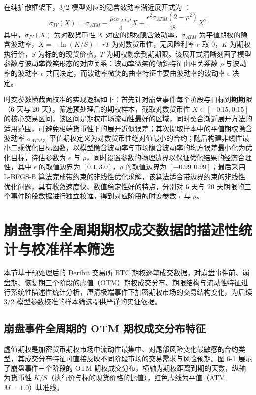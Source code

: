 在纯扩散框架下，3/2 模型对应的隐含波动率渐近展开式为\citet{medvedevApproximationCalibrationShortTerm2007} ：
\[
\sigma_{IV}(X) = \sigma_{ATM} - \frac{\rho \epsilon \sigma_{ATM}}{4} X + \frac{\epsilon^2 \sigma_{ATM} (2-\rho^2)}{48} X^2
\]
其中，$\sigma_{IV}(X)$ 为对数货币性 $X$ 对应的期权隐含波动率，$\sigma_{ATM}$ 为平值期权的隐含波动率，$X = -\ln(K/S) + rT$ 为对数货币性，无风险利率 $r$ 取 $0$，$K$ 为期权执行价，$S$ 为标的的现货价格，$T$ 为期权剩余到期期限。该展开式清晰刻画了模型参数与波动率微笑形态的对应关系：波动率微笑的倾斜特征由相关系数 $\rho$ 与波动率的波动率 $\epsilon$ 共同决定，而波动率微笑的曲率特征主要由波动率的波动率 $\epsilon$ 决定。

时变参数横截面校准的实现逻辑如下：首先针对崩盘事件每个阶段与目标到期期限（6 天与 20 天），筛选预处理后的期权样本，截取对数货币性 $X \in [-0.15, 0.15]$ 的核心交易区间，该区间是期权市场流动性最好的区域，同时契合渐近展开方法的适用范围，可避免极端货币性下的展开近似误差；其次提取样本中的平值期权隐含波动率 $\sigma_{ATM}$，平值期权定义为对数货币性绝对值最小的合约；随后构建非线性最小二乘优化目标函数，以模型隐含波动率与市场隐含波动率的均方误差最小化为优化目标，待估参数为 $\epsilon$ 与 $\rho$，同时设置参数的物理边界以保证优化结果的经济合理性，其中 $\epsilon$ 的取值边界为 $[0.1, 3.0]$，$\rho$ 的取值边界为 $[-0.99, 0.99]$；最后采用 L-BFGS-B 算法完成带约束的非线性优化求解，该算法适合带边界约束的非线性优化问题，具有收敛速度快、数值稳定性好的特点，分别对 6 天与 20 天期限的三个事件阶段数据进行独立校准，得到对应阶段的时变参数 $\epsilon$ 与 $\rho$。

\section{崩盘事件全周期期权成交数据的描述性统计与校准样本筛选}

本节基于预处理后的 Deribit 交易所 BTC 期权逐笔成交数据，对崩盘事件前、崩盘期、恢复期三个阶段的虚值（OTM）期权成交分布、期限结构与流动性特征进行系统性描述性统计分析，厘清极端事件下加密期权市场的交易结构变化，为后续 3/2 模型参数校准的样本筛选提供严谨的实证依据。

\subsection{崩盘事件全周期的 OTM 期权成交分布特征}

虚值期权是加密货币期权市场中流动性最集中、对尾部风险变化最敏感的合约类型，其成交分布特征可直接反映不同阶段市场的交易需求与风险预期。图 6-1 展示了崩盘事件三个阶段的 OTM 期权成交分布，横轴为期权距离到期的天数，纵轴为货币性 $K/S$（执行价与标的现货价格的比值），红色虚线为平值（ATM, $M=1.0$）基准线。

